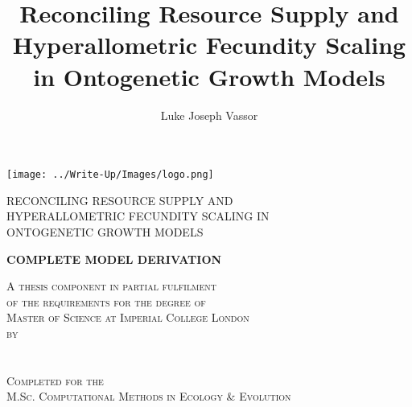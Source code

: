 \documentclass[a4paper]{article} %
\title{Reconciling Resource Supply and Hyperallometric Fecundity Scaling in Ontogenetic Growth Models}
\author{Luke Joseph Vassor}
\begin{document}
\begin{titlepage}
    
    \texttt{[image: ../Write-Up/Images/logo.png]}\\%
     
    
    \center %
    
    
    \makeatletter
    \linespread{1.5} %
        {\huge{RECONCILING RESOURCE SUPPLY AND \\ HYPERALLOMETRIC FECUNDITY SCALING IN \\ ONTOGENETIC GROWTH MODELS}\par} %
    \vspace{2cm}
        {\huge\bfseries{COMPLETE MODEL DERIVATION}\par}
    \vspace{2cm} %

    \textsc{A thesis component in partial fulfilment \\ of the requirements for the degree of \\ Master of Science at Imperial College London \\ by \\ \ }\\[2.5cm]
    \textsc{\Large \@author}\\[2.5cm]
    \textsc{Completed for the \\ M.Sc. Computational Methods in Ecology \& Evolution \ }\\[2cm]


\end{titlepage}
\end{document}
